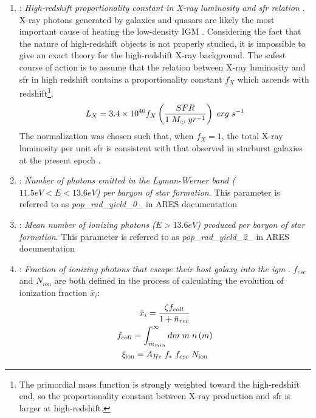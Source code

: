 \documentclass[12pt, TexShade, letterpaper]{report}
\begin{document}
\begin{enumerate}
    \item {}: \emph{High-redshift proportionality constant in X-ray luminosity and \gls{sfr} relation} \cite{ares_documentation}. 
    X-ray photons generated by galaxies and quasars are likely the most important cause of heating the low-density IGM \cite{low_frequency}. Considering the fact that the nature of high-redshift objects is not properly studied, it is impossible to give an exact theory for the high-redshift X-ray background. The safest course of action is to assume that the relation between X-ray luminosity and \gls{sfr} in high redshift contains a proportionality constant $f_X$ which ascends with redshift\footnote{The primordial mass function is strongly weighted toward the high-redshift end, so the proportionality constant between X-ray production and \gls{sfr} is larger at high-redshift.}.
    \begin{equation}
        L_X = 3.4 \times 10^{40} f_X \left( \frac{SFR}{1 \hspace{0.1cm} M_{\odot} \hspace{0.1cm} yr^{-1}}\right) \hspace{0.1cm} erg \hspace{0.1cm}s^{-1}
    \end{equation}
    The normalization was chosen such that, when $f_X =1$, the total X-ray luminosity per unit \gls{sfr} is consistent with that observed in starburst galaxies at the present epoch \cite{low_frequency, 21century}.
    
    \item {}: \emph{Number of photons emitted in the Lyman-Werner band ($11.5eV<E<13.6eV$) per baryon of star formation}. This parameter is referred to as \emph{pop\_rad\_yield\_0\_} in ARES documentation \cite{ares_documentation, lw_background}
    
    \item {}: \emph{Mean number of ionizing photons ($E>13.6eV$) produced per baryon of star formation}. This parameter is referred to as \emph{pop\_rad\_yield\_2\_} in ARES documentation \cite{ares_documentation, 21century}
    
    \item {}: \emph{Fraction of ionizing photons that escape their host galaxy into the \gls{igm}} \cite{ares_documentation}.
    $f_{esc}$ and $N_{ion}$ are both defined in the process of calculating the evolution of ionization fraction $\bar{x}_i$:
    \begin{gather}
        \bar{x}_i = \frac{\zeta f_{coll}}{1 + \bar{n}_{rec}}\\
        f_{coll} = \int_{m_{min}}^\infty dm \hspace{0.1cm} m \hspace{0.1cm} n\left(m\right)\\
        \xi_{\text{ion}} = A_{He} \hspace{0.1cm} f_* \hspace{0.1cm} f_{esc} \hspace{0.1cm} N_{\text{ion}} \label{eq:ionizing_efficiency}
    \end{gather}
    

\end{enumerate}
\end{document}
